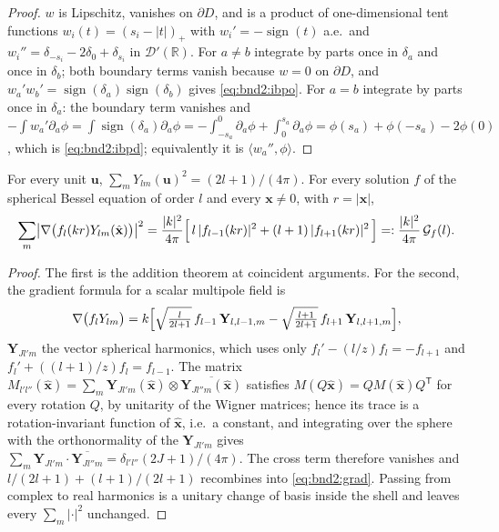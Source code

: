 \begin{proof}
$w$ is Lipschitz, vanishes on $\partial D$, and is a product of one-dimensional tent
functions $w_i(t) = (s_i-|t|)_+$ with $w_i' = -\operatorname{sign}(t)$ a.e.\ and
$w_i'' = \delta_{-s_i} - 2\delta_0 + \delta_{s_i}$ in $\mathcal{D}'(\mathbb{R})$. For
$a \neq b$ integrate by parts once in $\delta_a$ and once in $\delta_b$; both boundary
terms vanish because $w = 0$ on $\partial D$, and
$w_a'w_b' = \operatorname{sign}(\delta_a)\operatorname{sign}(\delta_b)$ gives
\eqref{eq:bnd2:ibpo}. For $a = b$ integrate by parts once in $\delta_a$: the boundary term
vanishes and $-\int w_a'\partial_a\phi = \int\operatorname{sign}(\delta_a)\partial_a\phi
= -\int_{-s_a}^{0}\partial_a\phi + \int_{0}^{s_a}\partial_a\phi
= \phi(s_a)+\phi(-s_a)-2\phi(0)$, which is \eqref{eq:bnd2:ibpd}; equivalently it is
$\langle w_a'',\phi\rangle$.
\end{proof}

\begin{lemma}
\label{lem:bnd2:msum}
For every unit $\mathbf{u}$, $\sum_m Y_{lm}(\mathbf{u})^2 = (2l+1)/(4\pi)$. For every
solution $f$ of the spherical Bessel equation of order $l$ and every
$\mathbf{x} \neq 0$, with $r = |\mathbf{x}|$,
\begin{equation}
\sum_{m}\bigl|\nabla\bigl(f_l(kr)Y_{lm}(\hat{\mathbf{x}})\bigr)\bigr|^2
= \frac{|k|^2}{4\pi}\Bigl[\,l\,|f_{l-1}(kr)|^2 + (l+1)\,|f_{l+1}(kr)|^2\,\Bigr]
=: \frac{|k|^2}{4\pi}\,\mathcal{G}_f(l).
\label{eq:bnd2:grad}
\end{equation}
\end{lemma}

\begin{proof}
The first is the addition theorem at coincident arguments. For the second, the gradient
formula for a scalar multipole field is
\[
\nabla\bigl(f_lY_{lm}\bigr) = k\Bigl[\sqrt{\tfrac{l}{2l+1}}\,f_{l-1}\,
\mathbf{Y}_{l,l-1,m} - \sqrt{\tfrac{l+1}{2l+1}}\,f_{l+1}\,\mathbf{Y}_{l,l+1,m}\Bigr],
\]
$\mathbf{Y}_{Jl'm}$ the vector spherical harmonics, which uses only
$f_l' - (l/z)f_l = -f_{l+1}$ and $f_l' + ((l+1)/z)f_l = f_{l-1}$. The matrix
$M_{l'l''}(\hat{\mathbf{x}}) = \sum_m \mathbf{Y}_{Jl'm}(\hat{\mathbf{x}})\otimes
\overline{\mathbf{Y}_{Jl''m}(\hat{\mathbf{x}})}$ satisfies $M(Q\hat{\mathbf{x}}) =
QM(\hat{\mathbf{x}})Q^{\mathsf{T}}$ for every rotation $Q$, by unitarity of the Wigner
matrices; hence its trace is a rotation-invariant function of $\hat{\mathbf{x}}$, i.e.\ a
constant, and integrating over the sphere with the orthonormality of the
$\mathbf{Y}_{Jl'm}$ gives $\sum_m\mathbf{Y}_{Jl'm}\!\cdot\!\overline{\mathbf{Y}_{Jl''m}}
= \delta_{l'l''}(2J+1)/(4\pi)$. The cross term therefore vanishes and
$l/(2l+1) + (l+1)/(2l+1)$ recombines into \eqref{eq:bnd2:grad}. Passing from complex to
real harmonics is a unitary change of basis inside the shell and leaves every
$\sum_m|\cdot|^2$ unchanged.
\end{proof}

